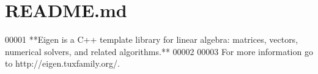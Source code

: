 \hypertarget{matio_2visual__studio_2test_2eigen_2_r_e_a_d_m_e_8md_source}{}\section{R\+E\+A\+D\+M\+E.\+md}

\begin{DoxyCode}
00001 **Eigen is a C++ template library for linear algebra: matrices, vectors, numerical solvers, and
       related algorithms.**
00002 
00003 For more information go to http://eigen.tuxfamily.org/.
\end{DoxyCode}
